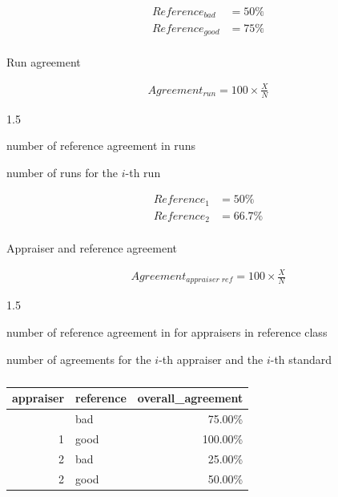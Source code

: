 \documentclass[
  a4paper,
]{scrbook}
\makeatletter
\let\oldparagraph\paragraph
\renewcommand{\paragraph}{
    \@ifstar
      \xxxParagraphStar
      \xxxParagraphNoStar
  }
\newcommand{\xxxParagraphStar}[1]{\oldparagraph*{#1}\mbox{}}
\newcommand{\xxxParagraphNoStar}[1]{\oldparagraph{#1}\mbox{}}
\providecommand{\tightlist}{%
  \setlength{\itemsep}{0pt}\setlength{\parskip}{0pt}}\usepackage{longtable,booktabs,array}
\let\olddescription\description
\let\endolddescription\enddescription
\renewenvironment{description}{
          \begin{spacing}{1.5}\olddescription
        }{
          \endolddescription\end{spacing}
        }
\makeatother
\begin{document}
\begin{align}
Reference_{bad} &= 50\% \nonumber \\
Reference_{good} &= 75\% \nonumber
\end{align}

\paragraph{Run agreement}\label{run-agreement}

\begin{align}
Agreement_{run} = 100 \times \frac{X}{N}
\end{align}

\begin{description}
\tightlist
\item[\(X\)]
number of reference agreement in runs
\item[\(N_i\)]
number of runs for the \(i\)-th run
\end{description}

\begin{align}
Reference_{1} &= 50\% \nonumber \\
Reference_{2} &= 66.7\% \nonumber
\end{align}

\paragraph{Appraiser and reference
agreement}\label{appraiser-and-reference-agreement}

\begin{align}
Agreement_{appraiser \; ref} = 100 \times \frac{X}{N}
\end{align}

\begin{description}
\tightlist
\item[\(X\)]
number of reference agreement in for appraisers in reference class
\item[\(N_i\)]
number of agreements for the \(i\)-th appraiser and the \(i\)-th
standard
\end{description}

\begingroup
\fontsize{12.0pt}{14.4pt}\selectfont

\begin{longtable}{rlr}

\caption{\label{tbl-app-ref-agree}}

\tabularnewline

\toprule
appraiser & reference & overall\_agreement \\ 
\midrule\addlinespace[2.5pt]
1 & bad & 75.00\% \\ 
1 & good & 100.00\% \\ 
2 & bad & 25.00\% \\ 
2 & good & 50.00\% \\ 
\bottomrule

\end{longtable}
\end{document}
